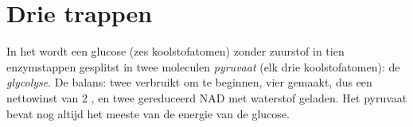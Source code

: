 \section{Drie trappen}

\begin{proposition}[Glycolyse]\label{prop:g12:respiration-fermentation:glycolysis}
In het  wordt een glucose (zes koolstofatomen) zonder zuurstof
in tien enzymstappen gesplitst in twee moleculen \emph{pyruvaat} (elk drie
koolstofatomen): de \emph{glycolyse}. De balans: twee 
verbruikt om te beginnen, vier gemaakt, dus een nettowinst van 2 , en
twee gereduceerd NAD met waterstof geladen. Het pyruvaat bevat nog altijd
het meeste van de energie van de glucose.
\end{proposition}
\admitted


